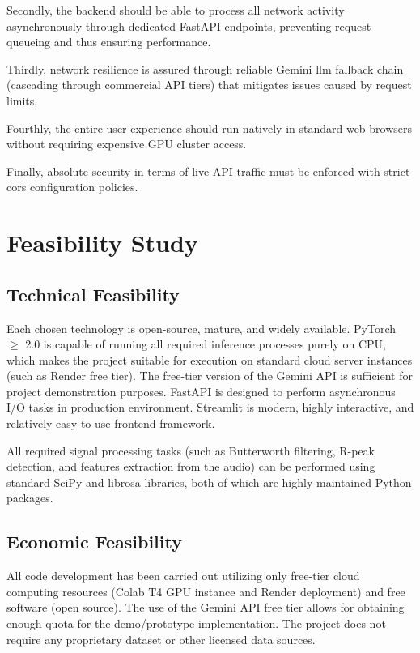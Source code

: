 Secondly, the backend should be able to process all network activity asynchronously through dedicated FastAPI endpoints, preventing request queueing and thus ensuring performance.

Thirdly, network resilience is assured through reliable Gemini \ac{llm} fallback chain (cascading through commercial API tiers) that mitigates issues caused by request limits.

Fourthly, the entire user experience should run natively in standard web browsers without requiring expensive GPU cluster access.

Finally, absolute security in terms of live API traffic must be enforced with strict \ac{cors} configuration policies.

\section{Feasibility Study}

\subsection{Technical Feasibility}

Each chosen technology is open-source, mature, and widely available. PyTorch $\geq$ 2.0 is capable of running all required inference processes purely on CPU, which makes the project suitable for execution on standard cloud server instances (such as Render free tier). The free-tier version of the Gemini API is sufficient for project demonstration purposes. FastAPI is designed to perform asynchronous I/O tasks in production environment. Streamlit is modern, highly interactive, and relatively easy-to-use frontend framework.

All required signal processing tasks (such as Butterworth filtering, R-peak detection, and features extraction from the audio) can be performed using standard SciPy and librosa libraries, both of which are highly-maintained Python packages.

\subsection{Economic Feasibility}

All code development has been carried out utilizing only free-tier cloud computing resources (Colab T4 GPU instance and Render deployment) and free software (open source). The use of the Gemini API free tier allows for obtaining enough quota for the demo/prototype implementation. The project does not require any proprietary dataset or other licensed data sources.

